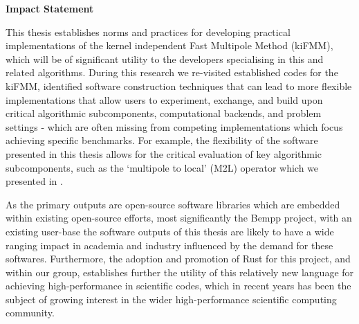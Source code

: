 
\thispagestyle{plain}

\begin{center}
    \textbf{Impact Statement}
\end{center}


This thesis establishes norms and practices for developing practical implementations of the kernel independent Fast Multipole Method (kiFMM), which will be of significant utility to the developers specialising in this and related algorithms. During this research we re-visited established codes for the kiFMM, identified software construction techniques that can lead to more flexible implementations that allow users to experiment, exchange, and build upon critical algorithmic subcomponents, computational backends, and problem settings - which are often missing from competing implementations which focus achieving specific benchmarks. For example, the flexibility of the software presented in this thesis allows for the critical evaluation of key algorithmic subcomponents, such as the `multipole to local' (M2L) operator which we presented in \cite{kailasa2024m2l}.

As the primary outputs are open-source software libraries \cite{kailasa2022pyexafmm,kailasa2024kifmmrs} which are embedded within existing open-source efforts, most significantly the Bempp project, with an existing user-base the software outputs of this thesis are likely to have a wide ranging impact in academia and industry influenced by the demand for these softwares. Furthermore, the adoption and promotion of Rust for this project, and within our group, establishes further the utility of this relatively new language for achieving high-performance in scientific codes, which in recent years has been the subject of growing interest in the wider high-performance scientific computing community.
